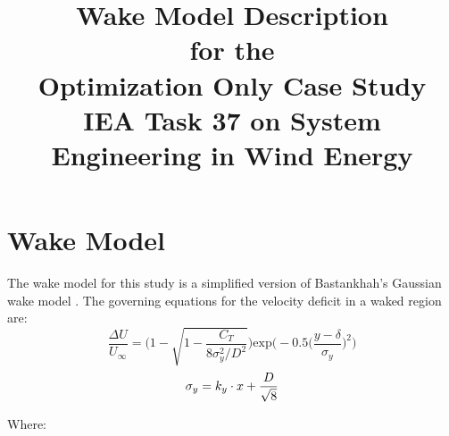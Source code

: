 \documentclass[12pt]{article}
\begin{document}
\title{\vspace{-3cm}Wake Model Description \\ \small{for the} \\ \large{Optimization Only Case Study} \\
    \small{IEA Task 37 on System Engineering in Wind Energy}}
    \date{\vspace{-3cm}}
\maketitle

\section*{Wake Model}
    The wake model for this study is a simplified version of Bastankhah's Gaussian wake model \cite{Thomas2018}. The governing equations for the velocity deficit in a waked region are:
    \begin{equation}
        \frac{\Delta U}{U_{\infty}}
        =
        \Bigg(
            1 - \sqrt{
                1 - \frac{C_T}
                    {8\sigma_{y}^{2}/D^2}
                }
        \Bigg)
                \text{exp}\bigg(
                    -0.5\Big(
                        \frac{y-\delta}{\sigma_{y}}
                    \Big)^2
                \bigg)
        \label{Eq:Bast}
    \end{equation}
    \begin{equation}
        \sigma_y = k_y\cdot x + \frac{D}{\sqrt{8}} \\
        \label{Eq:SigY}
    \end{equation}
    
    Where:
    
\end{document}

